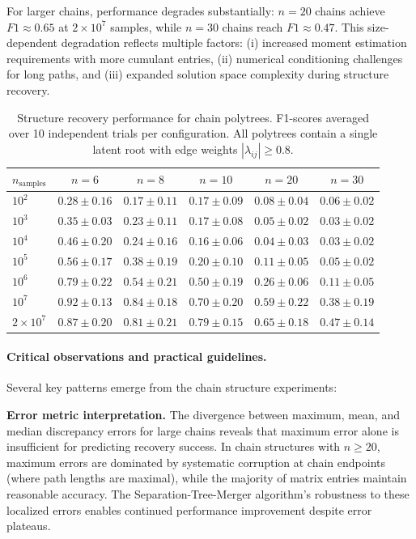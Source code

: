 \documentclass[11pt,a4paper]{article}
\numberwithin{equation}{section}
\begin{document}
For larger chains, performance degrades substantially: $n=20$ chains achieve $F1 \approx 0.65$ at $2 \times 10^7$ samples, while $n=30$ chains reach $F1 \approx 0.47$. This size-dependent degradation reflects multiple factors: (i) increased moment estimation requirements with more cumulant entries, (ii) numerical conditioning challenges for long paths, and (iii) expanded solution space complexity during structure recovery.


\begin{table}[h]
\centering
\caption{Structure recovery performance for chain polytrees. F1-scores averaged over 10 independent trials per configuration. All polytrees contain a single latent root with edge weights $|\lambda_{ij}| \geq 0.8$.}
\label{tab:chain_performance}
\begin{tabular}{lccccc}
\toprule
$n_{\text{samples}}$ & $n=6$ & $n=8$ & $n=10$ & $n=20$ & $n=30$ \\
\midrule
$10^2$ & $0.28 \pm 0.16$ & $0.17 \pm 0.11$ & $0.17 \pm 0.09$ & $0.08 \pm 0.04$ & $0.06 \pm 0.02$ \\
$10^3$ & $0.35 \pm 0.03$ & $0.23 \pm 0.11$ & $0.17 \pm 0.08$ & $0.05 \pm 0.02$ & $0.03 \pm 0.02$ \\
$10^4$ & $0.46 \pm 0.20$ & $0.24 \pm 0.16$ & $0.16 \pm 0.06$ & $0.04 \pm 0.03$ & $0.03 \pm 0.02$ \\
$10^5$ & $0.56 \pm 0.17$ & $0.38 \pm 0.19$ & $0.20 \pm 0.10$ & $0.11 \pm 0.05$ & $0.05 \pm 0.02$ \\
$10^6$ & $0.79 \pm 0.22$ & $0.54 \pm 0.21$ & $0.50 \pm 0.19$ & $0.26 \pm 0.06$ & $0.11 \pm 0.05$ \\
$10^7$ & $0.92 \pm 0.13$ & $0.84 \pm 0.18$ & $0.70 \pm 0.20$ & $0.59 \pm 0.22$ & $0.38 \pm 0.19$ \\
$2 \times 10^7$ & $0.87 \pm 0.20$ & $0.81 \pm 0.21$ & $0.79 \pm 0.15$ & $0.65 \pm 0.18$ & $0.47 \pm 0.14$ \\
\bottomrule
\end{tabular}
\end{table}

\paragraph{Critical observations and practical guidelines.} Several key patterns emerge from the chain structure experiments:

\textbf{Error metric interpretation.} The divergence between maximum, mean, and median discrepancy errors for large chains reveals that maximum error alone is insufficient for predicting recovery success. In chain structures with $n \geq 20$, maximum errors are dominated by systematic corruption at chain endpoints (where path lengths are maximal), while the majority of matrix entries maintain reasonable accuracy. The Separation-Tree-Merger algorithm's robustness to these localized errors enables continued performance improvement despite error plateaus.
\end{document}
